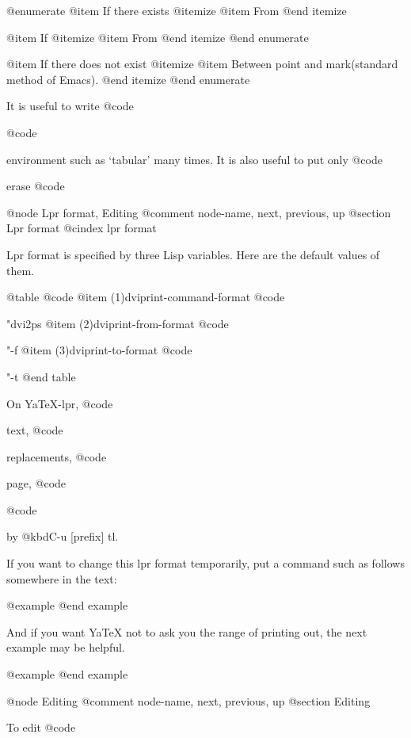{{{{{@enumerate
@item
If there exists %
@itemize
@item From %
@end itemize

@item
If %
@itemize
@item From %
@end itemize
@end enumerate

@item
If there does not exist %
@itemize
@item Between point and mark(standard method of Emacs).
@end itemize
@end enumerate

  It is useful to write @code{%
@code{%
environment such as `tabular' many times.  It is also useful to put only
@code{%
erase @code{%

@node Lpr format, Editing %
@comment  node-name,  next,  previous,  up
@section Lpr format
@cindex lpr format

  Lpr format is specified by three Lisp variables.  Here are the
default values of them.

@table @code
@item (1)dviprint-command-format
        @code{"dvi2ps %
@item (2)dviprint-from-format
        @code{"-f %
@item (3)dviprint-to-format
        @code{"-t %
@end table

  On YaTeX-lpr, @code{%
text, @code{%
replacements, @code{%
page, @code{%
@code{%
by @kbd{C-u [prefix] tl}.

  If you want to change this lpr format temporarily, put a command
such as follows somewhere in the text:

@example
@end example

  And if you want YaTeX not to ask you the range of printing
out, the next example may be helpful.

@example
@end example

@node Editing %
@comment  node-name,  next,  previous,  up
@section Editing %

  To edit @code{%

}}}}}}}}}}}}}}}}}}
